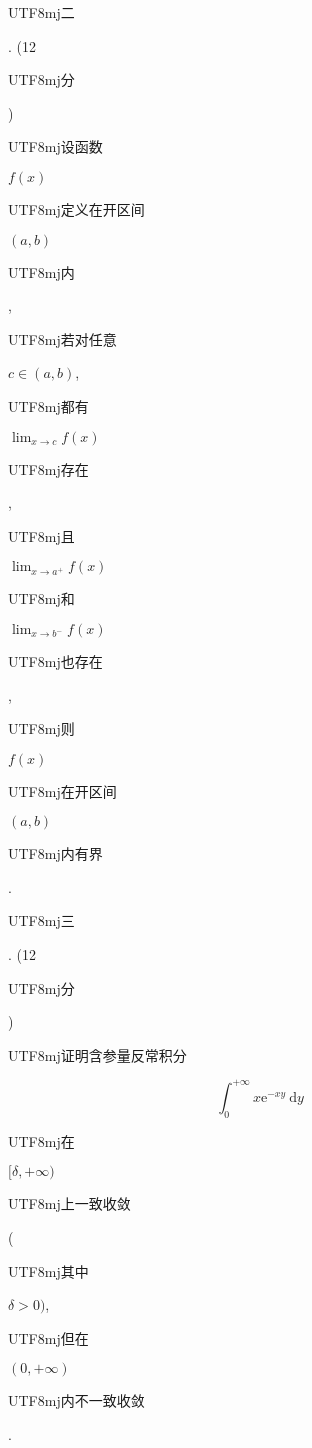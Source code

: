 \documentclass[10pt]{article}
\begin{document}
\begin{CJK}{UTF8}{mj}二\end{CJK}. (12 \begin{CJK}{UTF8}{mj}分\end{CJK}) \begin{CJK}{UTF8}{mj}设函数\end{CJK} $f(x)$ \begin{CJK}{UTF8}{mj}定义在开区间\end{CJK} $(a, b)$ \begin{CJK}{UTF8}{mj}内\end{CJK}, \begin{CJK}{UTF8}{mj}若对任意\end{CJK} $c \in(a, b)$, \begin{CJK}{UTF8}{mj}都有\end{CJK} $\lim _{x \rightarrow c} f(x)$ \begin{CJK}{UTF8}{mj}存在\end{CJK}, \begin{CJK}{UTF8}{mj}且\end{CJK} $\lim _{x \rightarrow a^{+}} f(x)$ \begin{CJK}{UTF8}{mj}和\end{CJK} $\lim _{x \rightarrow b^{-}} f(x)$ \begin{CJK}{UTF8}{mj}也存在\end{CJK}, \begin{CJK}{UTF8}{mj}则\end{CJK} $f(x)$ \begin{CJK}{UTF8}{mj}在开区间\end{CJK} $(a, b)$ \begin{CJK}{UTF8}{mj}内有界\end{CJK}.

\begin{CJK}{UTF8}{mj}三\end{CJK}. (12 \begin{CJK}{UTF8}{mj}分\end{CJK}) \begin{CJK}{UTF8}{mj}证明含参量反常积分\end{CJK}
$$
\int_{0}^{+\infty} x \mathrm{e}^{-x y} \mathrm{~d} y
$$
\begin{CJK}{UTF8}{mj}在\end{CJK} $[\delta,+\infty)$ \begin{CJK}{UTF8}{mj}上一致收敛\end{CJK} (\begin{CJK}{UTF8}{mj}其中\end{CJK} $\delta>0)$, \begin{CJK}{UTF8}{mj}但在\end{CJK} $(0,+\infty)$ \begin{CJK}{UTF8}{mj}内不一致收敛\end{CJK}.
\end{document}

